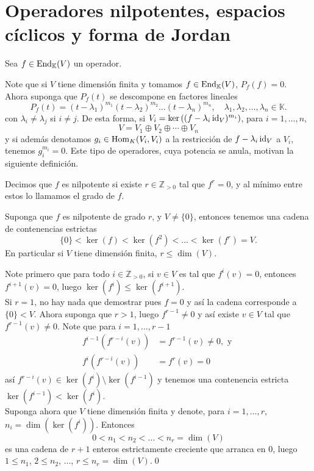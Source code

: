 \section{Operadores nilpotentes, espacios c\'iclicos y forma de Jordan}

Sea $f\in\operatorname{End}_\mathbb{K}(V)$ un operador.

\begin{obs}
Note que si $V$ tiene dimensi\'on finita y tomamos $f\in\operatorname{End}_\mathbb{K}(V)$, $P_f(f)=0$. Ahora suponga que $P_f(t)$ se descompone en factores lineales
\[
P_f(t)=(t-\lambda_1)^{m_1}(t-\lambda_2)^{m_2}\ldots(t-\lambda_n)^{m_n}, \quad \lambda_1,\lambda_2,\ldots,\lambda_n\in \mathbb{K}.
\]
con $\lambda_i\ne\lambda_j$ si $i\ne j$. De esta forma, si $V_i=\ker\left((f-\lambda_i\operatorname{id}_V)^{m_i}\right)$, para $i=1,\ldots,n$,
\[
V=V_1\oplus V_2\oplus\cdots\oplus V_n
\]
y si adem\'as denotamos $g_i\in\operatorname{Hom}_K(V_i,V_i)$ a la restricci\'on de $f-\lambda_i\operatorname{id}_V$ a $V_i$, tenemos $g_i^{m_i}=0$. Este tipo de operadores, cuya potencia se anula, motivan la siguiente definici\'on.
\end{obs}

\begin{defn}
Decimos que $f$ es nilpotente si existe $r\in\mathbb{Z}_{>0}$ tal que $f^r=0$, y al m\'inimo entre estos lo llamamos el grado de $f$.
\end{defn}

\begin{pro}
Suponga que $f$ es nilpotente de grado $r$, y $V\ne\{0\}$, entonces tenemos una cadena de contenencias estrictas
\[
\{0\}<\ker(f)<\ker(f^2)<\ldots<\ker(f^r)=V.
\]
En particular si $V$ tiene dimensi\'on finita, $r\le\dim(V)$.
\end{pro}

\dem Note primero que para todo $i\in\mathbb{Z}_{>0}$, si $v\in V$ es tal que $f^i(v)=0$, entonces $f^{i+1}(v)=0$, luego $\ker(f^i)\le\ker(f^{i+1})$.\\
Si $r=1$, no hay nada que demostrar pues $f=0$ y as\'i la cadena corresponde a $\{0\}<V$. Ahora suponga que $r>1$, luego $f^{r-1}\ne 0$ y as\'i existe $v\in V$ tal que $f^{r-1}(v)\ne 0$. Note que para $i=1,\ldots,r-1$
\begin{align*}
f^{i-1}\left(f^{r-i}(v)\right) & =f^{r-1}(v)\ne 0,\textrm{ y }\\
  f^i\left(f^{r-i}(v)\right) & =f^r(v)=0
\end{align*}
as\'i $f^{r-i}(v)\in \ker(f^i)\setminus \ker(f^{i-1})$ y tenemos una contenencia estricta $\ker(f^{i-1})<\ker(f^i)$.\\
Suponga ahora que $V$ tiene dimensi\'on finita y denote, para $i=1,\ldots,r$, $n_i=\dim(\ker(f^i))$. Entonces
\[
0<n_1<n_2<\ldots<n_r=\dim(V)
\]
es una cadena de $r+1$ enteros estrictamente creciente que arranca en $0$, luego $1\le n_1$, $2\le n_2$, $\ldots$, $r\le n_r=\dim(V)$.\qed

